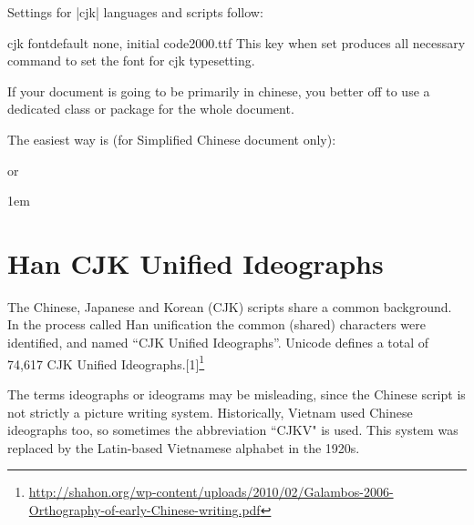Settings for |cjk| languages and scripts follow:

\begin{docKey}[phd]{cjk font}{}{default none, initial code2000.ttf}
This key when set produces all necessary command to set the font for cjk typesetting.
\end{docKey}

If your document is going to be primarily in chinese, you better off to use a dedicated class or package for the whole document. 

The easiest way is (for Simplified Chinese document only):


or





\parindent1em
\section{Han CJK Unified Ideographs}
\label{s:han}
The Chinese, Japanese and Korean (CJK) scripts share a common background. In the process called Han unification the common (shared) characters were identified, and named ``CJK Unified Ideographs''. Unicode defines a total of 74,617 CJK Unified Ideographs.[1]\footnote{\protect\url{http://shahon.org/wp-content/uploads/2010/02/Galambos-2006-Orthography-of-early-Chinese-writing.pdf}}



The terms ideographs or ideograms may be misleading, since the Chinese script is not strictly a picture writing system.
Historically, Vietnam used Chinese ideographs too, so sometimes the abbreviation ``CJKV" is used. This system was replaced by the Latin-based Vietnamese alphabet in the 1920s.


